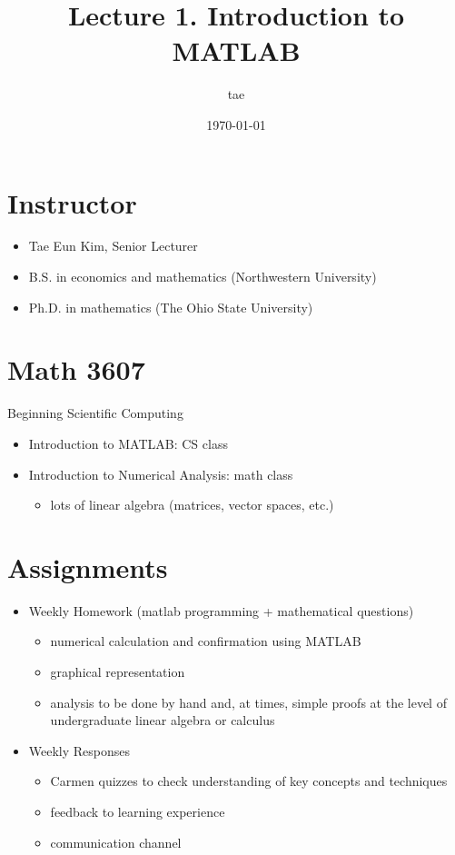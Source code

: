 \documentclass[11pt]{article}
\author{tae}
\date{\today}
\title{Lecture 1. Introduction to MATLAB}
\begin{document}
\maketitle
\tableofcontents


\section{Instructor}
\label{sec:orgdf4a16d}
\begin{itemize}
\item Tae Eun Kim, Senior Lecturer
\item B.S. in economics and mathematics (Northwestern University)
\item Ph.D. in mathematics (The Ohio State University)
\end{itemize}

\section{Math 3607}
\label{sec:org4537c41}
Beginning Scientific Computing
\begin{itemize}
\item Introduction to MATLAB: CS class
\item Introduction to Numerical Analysis: math class
\begin{itemize}
\item lots of linear algebra (matrices, vector spaces, etc.)
\end{itemize}
\end{itemize}

\section{Assignments}
\label{sec:orgb3c72db}
\begin{itemize}
\item Weekly Homework (matlab programming + mathematical questions)
\begin{itemize}
\item numerical calculation and confirmation using MATLAB
\item graphical representation
\item analysis to be done by hand and, at times, simple proofs at the level of undergraduate linear algebra or calculus
\end{itemize}
\item Weekly Responses
\begin{itemize}
\item Carmen quizzes to check understanding of key concepts and techniques
\item feedback to learning experience
\item communication channel
\end{itemize}
\end{itemize}
\end{document}
